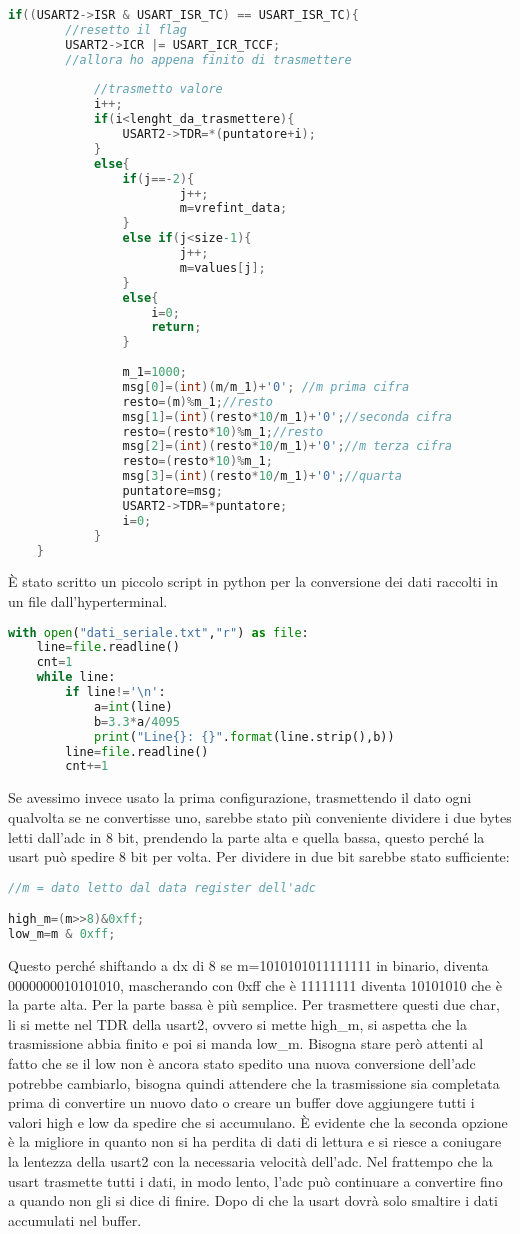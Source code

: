 \documentclass[main.tex]{subfiles}
\begin{document}
\begin{lstlisting}[caption=Interrupt USART2, language=C]
if((USART2->ISR & USART_ISR_TC) == USART_ISR_TC){
		//resetto il flag
		USART2->ICR |= USART_ICR_TCCF;
		//allora ho appena finito di trasmettere
		
			//trasmetto valore
			i++;
			if(i<lenght_da_trasmettere){
				USART2->TDR=*(puntatore+i);
			}
			else{
				if(j==-2){
						j++;
						m=vrefint_data;
				}
				else if(j<size-1){
						j++;
						m=values[j];
				}
				else{
					i=0; 
					return;
				}
				
				m_1=1000;
				msg[0]=(int)(m/m_1)+'0'; //m prima cifra
				resto=(m)%m_1;//resto
				msg[1]=(int)(resto*10/m_1)+'0';//seconda cifra
				resto=(resto*10)%m_1;//resto
				msg[2]=(int)(resto*10/m_1)+'0';//m terza cifra
				resto=(resto*10)%m_1;
				msg[3]=(int)(resto*10/m_1)+'0';//quarta
				puntatore=msg;
				USART2->TDR=*puntatore;
				i=0;
			}
	}
\end{lstlisting}
È stato scritto un piccolo script in python per la conversione dei dati raccolti in un file dall'hyperterminal. 
\begin{lstlisting}[caption=script.py,language=python]
with open("dati_seriale.txt","r") as file:
    line=file.readline()
    cnt=1
    while line:
        if line!='\n':
            a=int(line)
            b=3.3*a/4095
            print("Line{}: {}".format(line.strip(),b))
        line=file.readline()
        cnt+=1
\end{lstlisting}
Se avessimo invece usato la prima configurazione, trasmettendo il dato ogni qualvolta se ne convertisse uno, sarebbe stato più conveniente dividere i due bytes letti dall'adc in 8 bit, prendendo la parte alta e quella bassa, questo perché la usart può spedire 8 bit per volta. 
Per dividere in due bit sarebbe stato sufficiente:
\begin{lstlisting}[caption= Divisione dei 2 byte da inviare, language=C]
//m = dato letto dal data register dell'adc

high_m=(m>>8)&0xff;
low_m=m & 0xff; 

\end{lstlisting}
Questo perché shiftando a dx di 8 se m=1010101011111111 in binario, diventa 0000000010101010, mascherando con 0xff che è 11111111 diventa 10101010 che è la parte alta. Per la parte bassa è più semplice.
Per trasmettere questi due char, li si mette nel TDR della usart2, ovvero si mette high\_m, si aspetta che la trasmissione abbia finito e poi si manda low\_m. Bisogna stare però attenti al fatto che se il low non è ancora stato spedito una nuova conversione dell'adc potrebbe cambiarlo, bisogna quindi attendere che la trasmissione sia completata prima di convertire un nuovo dato o creare un buffer dove aggiungere tutti i valori high e low da spedire che si accumulano. È evidente che la seconda opzione è la migliore in quanto non si ha perdita di dati di lettura e si riesce a coniugare la lentezza della usart2 con la necessaria velocità dell'adc. Nel frattempo che la usart trasmette tutti i dati, in modo lento, l'adc può continuare a convertire fino a quando non gli si dice di finire. Dopo di che la usart dovrà solo smaltire i dati accumulati nel buffer. 
\end{document}
